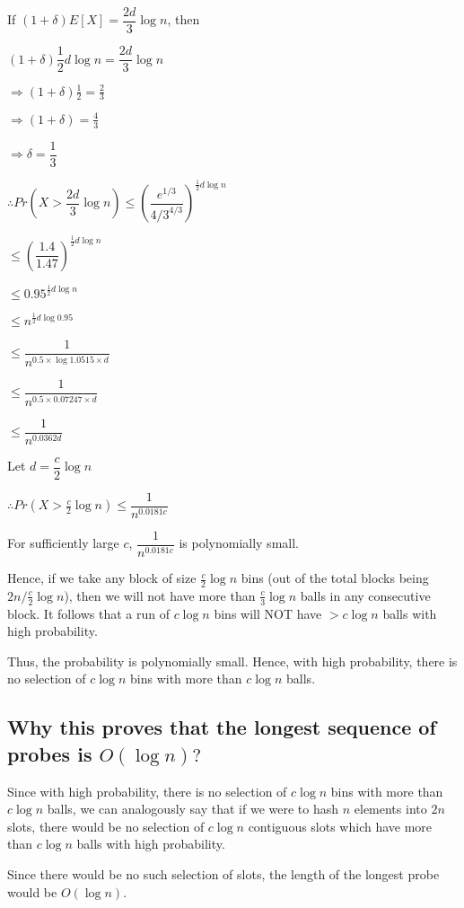 \documentclass{article}
\begin{document}
If $(1+\delta)E[X] = \dfrac{2d}{3}\log{n}$, then

$(1+\delta)\dfrac{1}{2}d\log{n} = \dfrac{2d}{3}\log{n}$

$\Rightarrow (1+\delta)\frac{1}{2} = \frac{2}{3}$

$\Rightarrow (1+\delta) = \frac{4}{3}$

$\Rightarrow \delta = \dfrac{1}{3}$

$\therefore Pr(X > \dfrac{2d}{3}\log{n}) \le \left( \dfrac{e^{1/3}}{{4/3}^{4/3}} \right)^{\frac{1}{2}d\log{n}}$

$\le \left( \dfrac{1.4}{1.47} \right)^{\frac{1}{2}d\log{n}}$

$\le 0.95^{\frac{1}{2}d\log{n}}$

$\le n^{\frac{1}{2}d\log{0.95}}$

$\le \dfrac{1}{n^{0.5 \times \log{1.0515} \times d}}$

$\le \dfrac{1}{n^{0.5 \times 0.07247 \times d}}$

$\le \dfrac{1}{n^{0.0362d}}$

Let $d = \dfrac{c}{2}\log{n}$

$\therefore Pr(X > \frac{c}{2}\log{n}) \le \dfrac{1}{n^{0.0181c}}$

For sufficiently large $c$, $\dfrac{1}{n^{0.0181c}}$ is polynomially small.

Hence, if we take any block of size $\frac{c}{2}\log{n}$ bins (out of
the total blocks being ${2n}/{\frac{c}{2}\log{n}}$), then we will
not have more than $\frac{c}{3}\log{n}$ balls in any consecutive
block. It follows that a run of $c\log{n}$ bins will NOT have $>
c\log{n}$ balls with high probability.

Thus, the probability is polynomially small. Hence, with high
probability, there is no selection of $c\log{n}$ bins with more than
$c\log{n}$ balls.

\subsection{Why this proves that the longest sequence of probes
is $O(\log{n})?$}

Since with high probability, there is no selection of $c\log{n}$ bins
with more than $c\log{n}$ balls, we can analogously say that if we
were to hash $n$ elements into $2n$ slots, there would be no selection
of $c\log{n}$ contiguous slots which have more than $c\log{n}$ balls
with high probability.

Since there would be no such selection of slots, the length of the
longest probe would be $O(\log{n})$.

\clearpage
\end{document}
